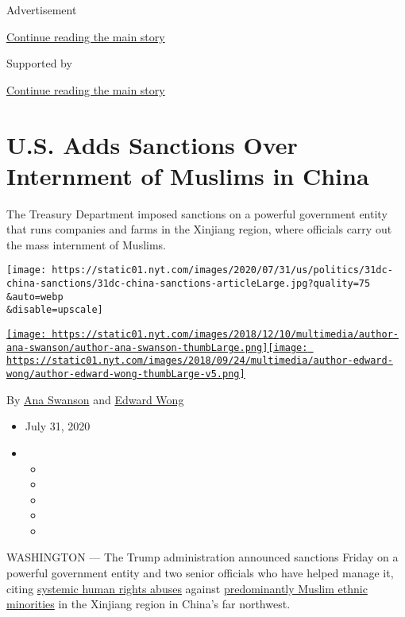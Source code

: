 Advertisement

\protect\hyperlink{after-top}{Continue reading the main story}

Supported by

\protect\hyperlink{after-sponsor}{Continue reading the main story}

\hypertarget{us-adds-sanctions-over-internment-of-muslims-in-china}{%
\section{U.S. Adds Sanctions Over Internment of Muslims in
China}\label{us-adds-sanctions-over-internment-of-muslims-in-china}}

The Treasury Department imposed sanctions on a powerful government
entity that runs companies and farms in the Xinjiang region, where
officials carry out the mass internment of Muslims.

\texttt{[image: https://static01.nyt.com/images/2020/07/31/us/politics/31dc-china-sanctions/31dc-china-sanctions-articleLarge.jpg?quality=75\\\&auto=webp\\\&disable=upscale]}

\href{https://www.nytimes.com/by/ana-swanson}{\texttt{[image: https://static01.nyt.com/images/2018/12/10/multimedia/author-ana-swanson/author-ana-swanson-thumbLarge.png]}}\href{https://www.nytimes.com/by/edward-wong}{\texttt{[image: https://static01.nyt.com/images/2018/09/24/multimedia/author-edward-wong/author-edward-wong-thumbLarge-v5.png]}}

By \href{https://www.nytimes.com/by/ana-swanson}{Ana Swanson} and
\href{https://www.nytimes.com/by/edward-wong}{Edward Wong}

\begin{itemize}
\item
  July 31, 2020
\item
  \begin{itemize}
  \item
  \item
  \item
  \item
  \item
  \end{itemize}
\end{itemize}

WASHINGTON --- The Trump administration announced sanctions Friday on a
powerful government entity and two senior officials who have helped
manage it, citing
\href{https://www.nytimes.com/2020/05/09/us/politics/china-uighurs-arrest.html}{systemic
human rights abuses} against
\href{https://www.nytimes.com/2018/10/18/world/asia/uighur-muslims-china-detainment.html}{predominantly
Muslim ethnic minorities} in the Xinjiang region in China's far
northwest.

